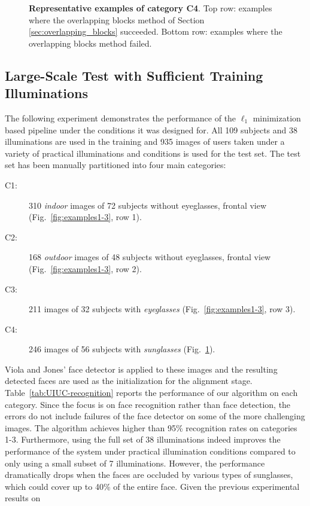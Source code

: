 \begin{figure}[t]
\begin{tabular}{@{}c@{}c@{}c@{}c@{}c@{}c@{}}
\end{tabular}
\caption{\small{\bf Representative examples of category C4}. Top row: examples
where the overlapping blocks method of Section \ref{sec:overlapping_blocks}
succeeded. Bottom row: examples where the overlapping blocks method
failed.}
\label{fig:examples4} 
\end{figure}

\subsection{Large-Scale Test with Sufficient Training
Illuminations} The following experiment demonstrates the performance
of the $\ell_1$ minimization based pipeline under the conditions it
was designed for.  All 109 subjects and 38 illuminations
are used in the training and 935 images of users taken under a variety of
practical illuminations and conditions is used for the test set. 
The test set has been manually partitioned into four main categories:
\begin{description}
\item[C1:] 310 \emph{indoor} images of 72 subjects without
    eyeglasses, frontal view
    (Fig.~\ref{fig:examples1-3}, row 1).
\item[C2:] 168 \emph{outdoor} images of 48 subjects without
    eyeglasses, frontal view
    (Fig.~\ref{fig:examples1-3}, row 2).
\item[C3:] 211 images of 32 subjects with \emph{eyeglasses}
    (Fig.~\ref{fig:examples1-3}, row 3).
\item[C4:] 246 images of 56 subjects with \emph{sunglasses}
    (Fig.~\ref{fig:examples4}).
\end{description}
Viola and Jones' face detector is applied to these images and
the resulting detected faces are used as the 
initialization for the alignment stage.
Table~\ref{tab:UIUC-recognition} reports the performance of our
algorithm on each category.
Since the focus is on face
recognition rather than face detection, 
the errors do not include failures of the face
detector on some of the more challenging images.
The algorithm achieves higher than 95\%
recognition rates on categories 1-3. Furthermore, using the
full set of 38 illuminations indeed improves the performance of
the system under practical illumination conditions compared to
only using a small subset of 7 illuminations. However, the
performance dramatically drops when the faces are occluded by
various types of sunglasses, which could cover up to 40\% of
the entire face. Given the previous experimental results on
